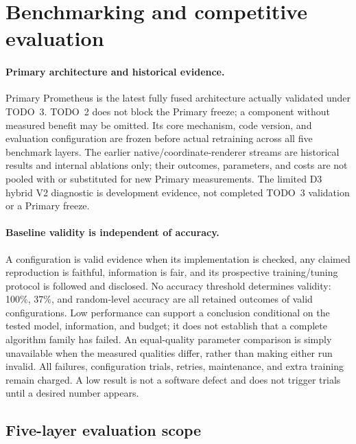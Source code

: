 \section{Benchmarking and competitive evaluation}
\label{sec:benchmarking}
\label{app:benchmarking}

\paragraph{Primary architecture and historical evidence.}
Primary Prometheus is the latest fully fused architecture actually validated
under TODO~3. TODO~2 does not block the Primary freeze; a component without
measured benefit may be omitted. Its core mechanism, code version, and evaluation configuration
are frozen before actual retraining across all five benchmark layers. The
earlier native/coordinate-renderer streams are historical results and internal
ablations only; their outcomes, parameters, and costs are not pooled with or
substituted for new Primary measurements. The limited D3 hybrid V2 diagnostic
is development evidence, not completed TODO~3 validation or a Primary freeze.

\paragraph{Baseline validity is independent of accuracy.}
A configuration is valid evidence when its implementation is checked, any
claimed reproduction is faithful, information is fair, and its prospective
training/tuning protocol is followed and disclosed. No accuracy threshold
determines validity: 100\%, 37\%, and random-level accuracy are all retained
outcomes of valid configurations. Low performance can support a conclusion
conditional on the tested model, information, and budget; it does not establish
that a complete algorithm family has failed. An equal-quality parameter
comparison is simply unavailable when the measured qualities differ, rather
than making either run invalid. All failures, configuration trials, retries,
maintenance, and extra training remain charged. A low result is not a software
defect and does not trigger trials until a desired number appears.

\subsection{Five-layer evaluation scope}

